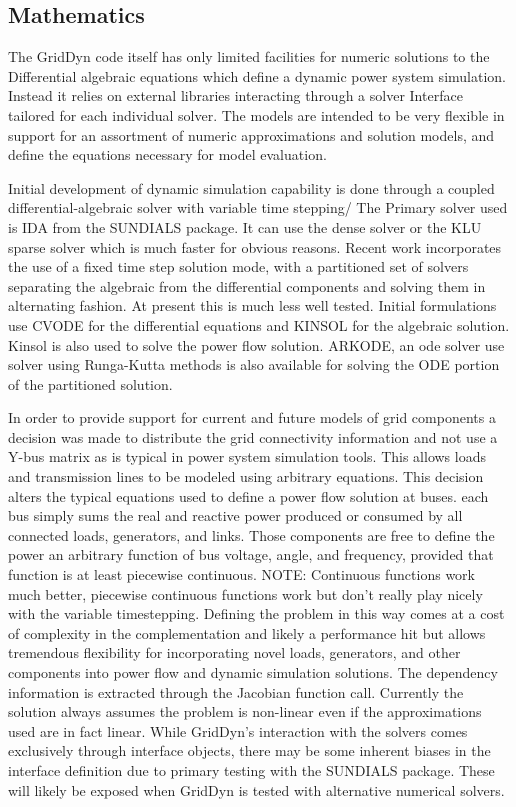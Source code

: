 \documentclass[12pt]{article} %
\begin{document}
\subsection{Mathematics}
The GridDyn code itself has only limited facilities for numeric solutions to the Differential algebraic equations which define a dynamic power system simulation.  Instead it relies on external libraries interacting through a solver Interface tailored for each individual solver.  The models are intended to be very flexible in support for an assortment of numeric approximations and solution models, and define the equations necessary for model evaluation.

Initial development of dynamic simulation capability is done through a coupled differential-algebraic solver with variable time stepping/  The Primary solver used is IDA from the SUNDIALS package\cite{sundials}.  It can use the dense solver or the KLU sparse solver which is much faster for obvious reasons.  Recent work incorporates the use of a fixed time step solution mode, with a partitioned set of solvers separating the algebraic from the differential components and solving them in alternating fashion.  At present this is much less well tested.  Initial formulations use CVODE for the differential equations and KINSOL for the algebraic solution.  Kinsol is also used to solve the power flow solution.  ARKODE, an ode solver use solver using Runga-Kutta methods is also available for solving the ODE portion of the partitioned solution.

In order to provide support for current and future models of grid components a decision was made to distribute the grid connectivity information and not use a Y-bus matrix as is typical in power system simulation tools.  This allows loads and transmission lines to be modeled using arbitrary equations.  This decision alters the typical equations used to define a power flow solution at buses.  each bus simply sums the real and reactive power produced or consumed by all connected loads, generators, and links.  Those components are free to define the power an arbitrary function of bus voltage, angle, and frequency,  provided that function is at least piecewise continuous.  NOTE:  Continuous functions work much better, piecewise continuous functions work but don't really play nicely with the variable timestepping.  Defining the problem in this way comes at a cost of complexity in the complementation and likely a performance hit but allows tremendous flexibility for incorporating novel loads, generators, and other components into power flow and dynamic simulation solutions.  The dependency information is extracted through the Jacobian function call. Currently the solution always assumes the problem is non-linear even if the approximations used are in fact linear.  While GridDyn's interaction with the solvers comes exclusively through interface objects, there may be some inherent biases in the interface definition due to primary testing with the SUNDIALS package.  These will likely be exposed when GridDyn is tested with alternative numerical solvers.
\end{document}
